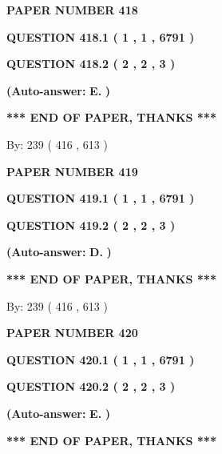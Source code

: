 \documentclass[12pt]{article}
\begin{document}
   
 {\textbf{ \Large{ PAPER NUMBER  418  }}}
   
   
   
   
  
  
{\textbf{\large{QUESTION
418.1 
 ( 1 , 1 , 6791 )
}}}
  
  
{\textbf{\large{QUESTION
418.2 
 ( 2 , 2 , 3 )
}}}
 
 
{\textbf{(Auto-answer:}}
{\textbf{\large{
E.}}}
{\textbf{)}}
 
 
   
   
   
   
\vspace{1.0in} 
{\textbf{\large{ *** END OF PAPER, THANKS *** }}} 
   
   
\hspace{1.0in} By: 
 239 ( 416 ,  613 )
   
   
   
   
\newpage 
\setcounter{page}{ 
   419001 } 
   
   
 {\textbf{ \Large{ PAPER NUMBER  419  }}}
   
   
   
   
  
  
{\textbf{\large{QUESTION
419.1 
 ( 1 , 1 , 6791 )
}}}
  
  
{\textbf{\large{QUESTION
419.2 
 ( 2 , 2 , 3 )
}}}
 
 
{\textbf{(Auto-answer:}}
{\textbf{\large{
D.}}}
{\textbf{)}}
 
 
   
   
   
   
\vspace{1.0in} 
{\textbf{\large{ *** END OF PAPER, THANKS *** }}} 
   
   
\hspace{1.0in} By: 
 239 ( 416 ,  613 )
   
   
   
   
\newpage 
\setcounter{page}{ 
   420001 } 
   
   
 {\textbf{ \Large{ PAPER NUMBER  420  }}}
   
   
   
   
  
  
{\textbf{\large{QUESTION
420.1 
 ( 1 , 1 , 6791 )
}}}
  
  
{\textbf{\large{QUESTION
420.2 
 ( 2 , 2 , 3 )
}}}
 
 
{\textbf{(Auto-answer:}}
{\textbf{\large{
E.}}}
{\textbf{)}}
 
 
   
   
   
   
\vspace{1.0in} 
{\textbf{\large{ *** END OF PAPER, THANKS *** }}} 
   
\end{document}

